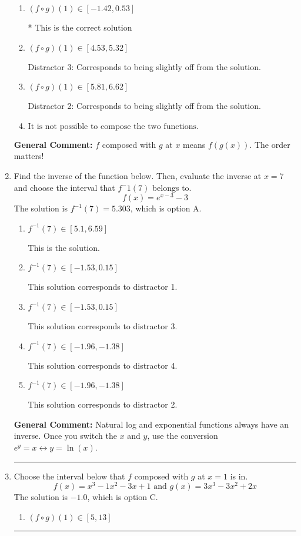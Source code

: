 \documentclass{extbook}[14pt]
\newcommand{\litem}[1]{\item #1

\rule{\textwidth}{0.4pt}}
\begin{document}
\begin{enumerate}
{\begin{enumerate}[label=\Alph*.]
 Distractor 1: Corresponds to reversing the composition.
\item \( (f \circ g)(1) \in [-1.42, 0.53] \)

* This is the correct solution
\item \( (f \circ g)(1) \in [4.53, 5.32] \)

 Distractor 3: Corresponds to being slightly off from the solution.
\item \( (f \circ g)(1) \in [5.81, 6.62] \)

 Distractor 2: Corresponds to being slightly off from the solution.
\item \( \text{It is not possible to compose the two functions.} \)


\end{enumerate}

\textbf{General Comment:} $f$ composed with $g$ at $x$ means $f(g(x))$. The order matters!
}
\litem{
Find the inverse of the function below. Then, evaluate the inverse at $x = 7$ and choose the interval that $f^-1(7)$ belongs to.
\[ f(x) = e^{x-3}-3 \]The solution is \( f^{-1}(7) = 5.303 \), which is option A.\begin{enumerate}[label=\Alph*.]
\item \( f^{-1}(7) \in [5.1, 6.59] \)

 This is the solution.
\item \( f^{-1}(7) \in [-1.53, 0.15] \)

 This solution corresponds to distractor 1.
\item \( f^{-1}(7) \in [-1.53, 0.15] \)

 This solution corresponds to distractor 3.
\item \( f^{-1}(7) \in [-1.96, -1.38] \)

 This solution corresponds to distractor 4.
\item \( f^{-1}(7) \in [-1.96, -1.38] \)

 This solution corresponds to distractor 2.
\end{enumerate}

\textbf{General Comment:} Natural log and exponential functions always have an inverse. Once you switch the $x$ and $y$, use the conversion $ e^y = x \leftrightarrow y=\ln(x)$.
}
\litem{
Choose the interval below that $f$ composed with $g$ at $x=1$ is in.
\[ f(x) = x^{3} -1 x^{2} -3 x + 1 \text{ and } g(x) = 3x^{3} -3 x^{2} +2 x \]The solution is \( -1.0 \), which is option C.\begin{enumerate}[label=\Alph*.]
\item \( (f \circ g)(1) \in [5, 13] \)


\end{enumerate}}
\end{enumerate}
\end{document}
